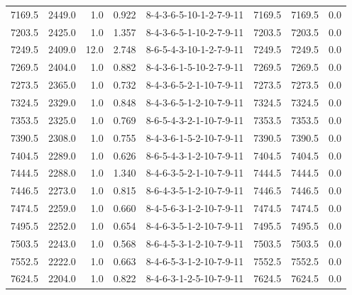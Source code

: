 \begin{tabular}{rrrrlrrr}
 7169.5 &  2449.0 &            1.0 &              0.922 &  8-4-3-6-5-10-1-2-7-9-11 &        7169.5 &          7169.5 &       0.0 \\
 7203.5 &  2425.0 &            1.0 &              1.357 &  8-4-3-6-5-1-10-2-7-9-11 &        7203.5 &          7203.5 &       0.0 \\
 7249.5 &  2409.0 &           12.0 &              2.748 &  8-6-5-4-3-10-1-2-7-9-11 &        7249.5 &          7249.5 &       0.0 \\
 7269.5 &  2404.0 &            1.0 &              0.882 &  8-4-3-6-1-5-10-2-7-9-11 &        7269.5 &          7269.5 &       0.0 \\
 7273.5 &  2365.0 &            1.0 &              0.732 &  8-4-3-6-5-2-1-10-7-9-11 &        7273.5 &          7273.5 &       0.0 \\
 7324.5 &  2329.0 &            1.0 &              0.848 &  8-4-3-6-5-1-2-10-7-9-11 &        7324.5 &          7324.5 &       0.0 \\
 7353.5 &  2325.0 &            1.0 &              0.769 &  8-6-5-4-3-2-1-10-7-9-11 &        7353.5 &          7353.5 &       0.0 \\
 7390.5 &  2308.0 &            1.0 &              0.755 &  8-4-3-6-1-5-2-10-7-9-11 &        7390.5 &          7390.5 &       0.0 \\
 7404.5 &  2289.0 &            1.0 &              0.626 &  8-6-5-4-3-1-2-10-7-9-11 &        7404.5 &          7404.5 &       0.0 \\
 7444.5 &  2288.0 &            1.0 &              1.340 &  8-4-6-3-5-2-1-10-7-9-11 &        7444.5 &          7444.5 &       0.0 \\
 7446.5 &  2273.0 &            1.0 &              0.815 &  8-6-4-3-5-1-2-10-7-9-11 &        7446.5 &          7446.5 &       0.0 \\
 7474.5 &  2259.0 &            1.0 &              0.660 &  8-4-5-6-3-1-2-10-7-9-11 &        7474.5 &          7474.5 &       0.0 \\
 7495.5 &  2252.0 &            1.0 &              0.654 &  8-4-6-3-5-1-2-10-7-9-11 &        7495.5 &          7495.5 &       0.0 \\
 7503.5 &  2243.0 &            1.0 &              0.568 &  8-6-4-5-3-1-2-10-7-9-11 &        7503.5 &          7503.5 &       0.0 \\
 7552.5 &  2222.0 &            1.0 &              0.663 &  8-4-6-5-3-1-2-10-7-9-11 &        7552.5 &          7552.5 &       0.0 \\
 7624.5 &  2204.0 &            1.0 &              0.822 &  8-4-6-3-1-2-5-10-7-9-11 &        7624.5 &          7624.5 &       0.0 \\

\end{tabular}
